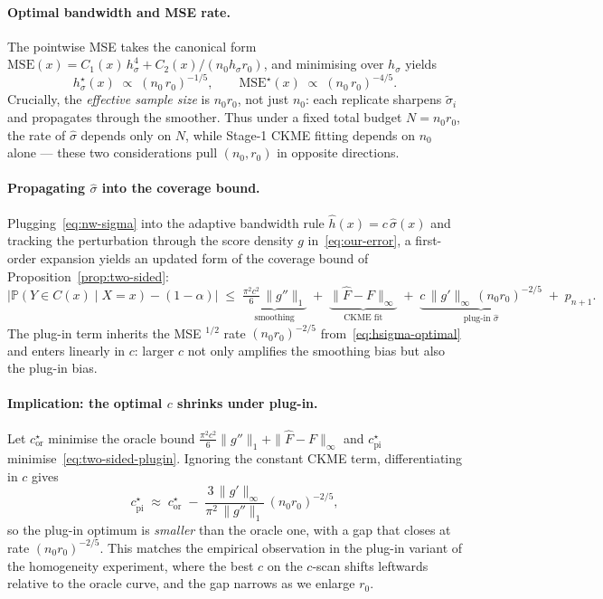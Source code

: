 \documentclass[11pt]{article}
\theoremstyle{remark}
\begin{document}
\paragraph{Optimal bandwidth and MSE rate.}
The pointwise MSE takes the canonical form
$\mathrm{MSE}(x) = C_1(x)\,h_\sigma^{4}
                    + C_2(x)/(n_0 h_\sigma r_0)$,
and minimising over $h_\sigma$ yields
\begin{equation}\label{eq:hsigma-optimal}
\boxed{\;
h_\sigma^{\star}(x)
   \;\propto\; (n_0\,r_0)^{-1/5},
\qquad
\mathrm{MSE}^{\star}(x)
   \;\propto\; (n_0\,r_0)^{-4/5}.
\;}
\end{equation}
Crucially, the \emph{effective sample size} is $n_0 r_0$, not just
$n_0$: each replicate sharpens $\tilde\sigma_i$ and propagates
through the smoother. Thus under a fixed total budget
$N = n_0 r_0$, the rate of $\hat\sigma$ depends only on $N$, while
Stage-1 CKME fitting depends on $n_0$ alone --- these two
considerations pull $(n_0,r_0)$ in opposite directions.

\paragraph{Propagating $\hat\sigma$ into the coverage bound.}
Plugging~\eqref{eq:nw-sigma} into the adaptive bandwidth rule
$\hat h(x) = c\,\hat\sigma(x)$ and tracking the perturbation
through the score density $g$ in~\eqref{eq:our-error}, a first-order
expansion yields an updated form of the coverage bound of
Proposition~\ref{prop:two-sided}:
\begin{equation}\label{eq:two-sided-plugin}
\bigl|\mathbb{P}(Y\in C(x)\mid X=x) - (1-\alpha)\bigr|
  \;\le\;
  \underbrace{\tfrac{\pi^2 c^{2}}{6}\,\|g''\|_{1}}_{\text{smoothing}}
  \;+\; \underbrace{\|\widehat F - F\|_{\infty}}_{\text{CKME fit}}
  \;+\; \underbrace{c\,\|g'\|_{\infty}\,
        (n_0 r_0)^{-2/5}}_{\text{plug-in $\hat\sigma$}}
  \;+\; p_{n+1}.
\end{equation}
The plug-in term inherits the MSE $^{1/2}$ rate
$(n_0 r_0)^{-2/5}$ from~\eqref{eq:hsigma-optimal} and enters
linearly in $c$: larger $c$ not only amplifies the smoothing bias
but also the plug-in bias.

\paragraph{Implication: the optimal $c$ shrinks under plug-in.}
Let $c_{\text{or}}^{\star}$ minimise the oracle bound
$\tfrac{\pi^2 c^{2}}{6}\|g''\|_{1} + \|\widehat F - F\|_{\infty}$
and $c_{\text{pi}}^{\star}$ minimise~\eqref{eq:two-sided-plugin}.
Ignoring the constant CKME term, differentiating in $c$ gives
\[
c_{\text{pi}}^{\star}
  \;\approx\;
  c_{\text{or}}^{\star}
  \;-\;
  \frac{3\,\|g'\|_{\infty}}{\pi^{2}\,\|g''\|_{1}}
         \,(n_0 r_0)^{-2/5},
\]
so the plug-in optimum is \emph{smaller} than the oracle one, with
a gap that closes at rate $(n_0 r_0)^{-2/5}$. This matches the
empirical observation in the plug-in variant of the homogeneity
experiment, where the best $c$ on the $c$-scan shifts leftwards
relative to the oracle curve, and the gap narrows as we enlarge
$r_0$.
\end{document}

